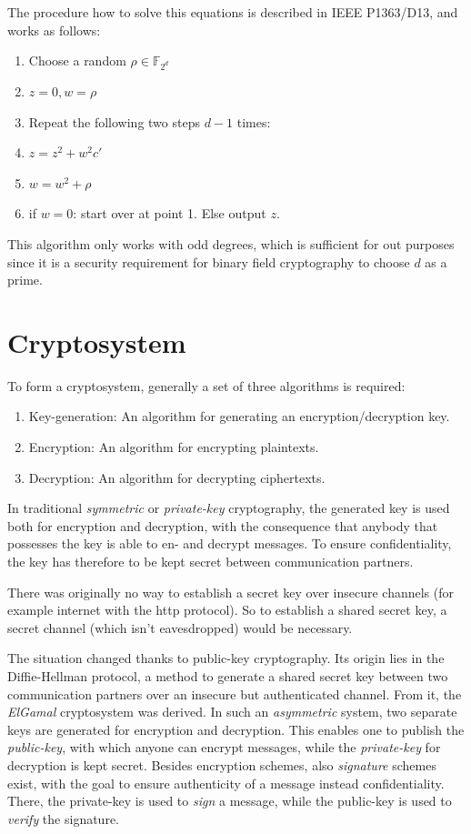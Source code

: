 \documentclass[11pt,english]{article}
\begin{document}
The procedure how to solve this equations is described in IEEE P1363/D13, and works as follows:
\begin{enumerate}
 \item Choose a random $\rho\in\mathbb{F}_{2^d}$
 \item $z=0,w=\rho$
 \item Repeat the following two steps $d-1$ times:
 \item $z=z^2+w^2c'$
 \item $w=w^2+\rho$
 \item if $w=0$: start over at point 1. Else output $z$.
\end{enumerate}

This algorithm only works with odd degrees, which is sufficient for out purposes since it is a security requirement for binary field cryptography to choose $d$ as a prime.

\section{Cryptosystem}
To form a cryptosystem, generally a set of three algorithms is required:
\begin{enumerate}
 \item Key-generation: An algorithm for generating an encryption/decryption key.
 \item Encryption: An algorithm for encrypting plaintexts.
 \item Decryption: An algorithm for decrypting ciphertexts.
\end{enumerate}
In traditional \emph{symmetric} or \emph{private-key} cryptography, the generated key is used both for encryption and decryption, with the consequence that anybody that possesses the key is able to en- and decrypt messages. To ensure confidentiality, the key has therefore to be kept secret between communication partners.

There was originally no way to establish a secret key over insecure channels (for example internet with the http protocol). So to establish a shared secret key, a secret channel (which isn't eavesdropped) would be necessary.

The situation changed thanks to public-key cryptography. Its origin lies in the Diffie-Hellman \cite{Diffie76newdirections} protocol, a method to generate a shared secret key between two communication partners over an insecure but authenticated channel. From it, the \emph{ElGamal} cryptosystem \cite{19480} was derived. In such an \emph{asymmetric} system, two separate keys are generated for encryption and decryption. This enables one to publish the \emph{public-key}, with which anyone can encrypt messages, while the \emph{private-key} for decryption is kept secret. Besides encryption schemes, also \emph{signature} schemes exist, with the goal to ensure authenticity of a message instead confidentiality. There, the private-key is used to \emph{sign} a message, while the public-key is used to \emph{verify} the signature.
\end{document}
